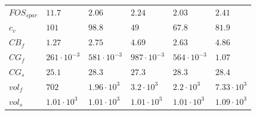 \begin{tabular}{llllll}
$FOS_{spar}$ & $11.7 $ & $2.06 $ & $2.24 $ & $2.03 $ & $2.41 $ \\ 
$c_v$ & $101 $ & $98.8 $ & $49 $ & $67.8 $ & $81.9 $ \\ 
$CB_f$ & $1.27 $ & $2.75 $ & $4.69 $ & $2.63 $ & $4.86 $ \\ 
$CG_f$ & $261 \cdot 10^{-3}$ & $581 \cdot 10^{-3}$ & $987 \cdot 10^{-3}$ & $564 \cdot 10^{-3}$ & $1.07 $ \\ 
$CG_s$ & $25.1 $ & $28.3 $ & $27.3 $ & $28.3 $ & $28.4 $ \\ 
$vol_f$ & $702 $ & $1.96 \cdot 10^{3}$ & $3.2 \cdot 10^{3}$ & $2.2 \cdot 10^{3}$ & $7.33 \cdot 10^{3}$ \\ 
$vol_s$ & $1.01 \cdot 10^{3}$ & $1.01 \cdot 10^{3}$ & $1.01 \cdot 10^{3}$ & $1.01 \cdot 10^{3}$ & $1.09 \cdot 10^{3}$ \\ 
\end{tabular}